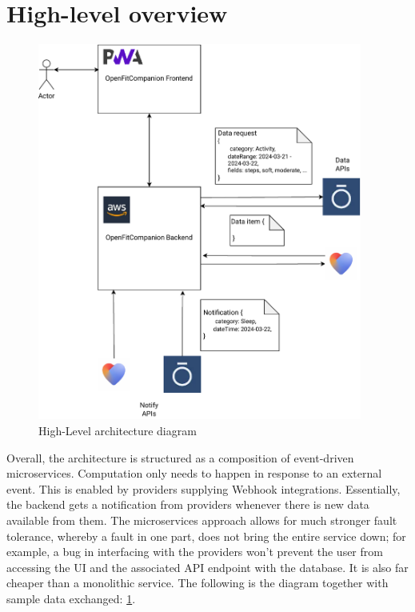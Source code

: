\section{High-level overview}
\begin{figure}
    
    \centering
    \includegraphics[width=0.95\textwidth,keepaspectratio]{../images/highLevel.pdf}
    \caption{High-Level architecture diagram}
    \label{fig:1}
    
\end{figure}
Overall, the architecture is structured as a composition of event-driven microservices. Computation only needs to happen in response to an external event. This is enabled by providers supplying Webhook integrations. Essentially, the backend gets a notification from providers whenever there is new data available from them. The microservices approach allows for much stronger fault tolerance, whereby a fault in one part, does not bring the entire service down; for example, a bug in interfacing with the providers won't prevent the user from accessing the UI and the associated API endpoint with the database. It is also far cheaper than a monolithic service. The following is the diagram together with sample data exchanged: \ref{fig:1}.

